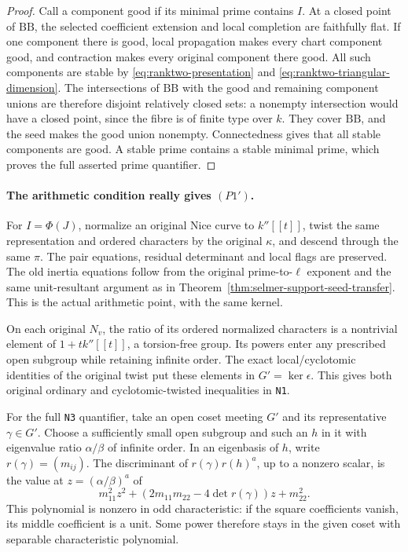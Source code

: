 \begin{proof}
Call a component good if its minimal prime contains $I$.  At a closed
point of $\mathrm{BB}$, the selected coefficient extension and local
completion are faithfully flat.  If one component there is good,
local propagation makes every chart component good, and contraction
makes every original component there good.  All such components
are stable by \eqref{eq:ranktwo-presentation} and
\eqref{eq:ranktwo-triangular-dimension}.  The intersections of
$\mathrm{BB}$ with the good and remaining component unions are
therefore disjoint relatively closed sets: a nonempty intersection
would have a closed point, since the fibre is of finite type over
$k$.  They cover $\mathrm{BB}$, and the seed makes the good union
nonempty.  Connectedness gives that all stable components are good.
A stable prime contains a stable minimal prime, which proves the
full asserted prime quantifier.
\end{proof}

\paragraph{The arithmetic condition really gives $(P1')$.}
For $I=\Phi(J)$, normalize an original Nice curve to $k''[[t]]$,
twist the same representation and ordered characters by the original
$\kappa$, and descend through the same $\pi$.  The pair equations,
residual determinant and local flags are preserved.  The old inertia
equations follow from the original prime-to-$\ell$ exponent and the
same unit-resultant argument as in
Theorem~\ref{thm:selmer-support-seed-transfer}.  This is the actual
arithmetic point, with the same kernel.

On each original $N_v$, the ratio of its ordered normalized
characters is a nontrivial element of $1+tk''[[t]]$, a torsion-free
group.  Its powers enter any prescribed open subgroup while
retaining infinite order.  The exact local/cyclotomic identities of
the original twist put these elements in $G'=\ker\epsilon$.
This gives both original ordinary and cyclotomic-twisted inequalities
in \texttt{N1}.

For the full \texttt{N3} quantifier, take an open coset meeting $G'$
and its representative $\gamma\in G'$.  Choose a sufficiently small
open subgroup and such an $h$ in it with eigenvalue ratio
$\alpha/\beta$ of infinite order.  In an eigenbasis of $h$, write
$r(\gamma)=(m_{ij})$.  The discriminant of $r(\gamma)r(h)^a$,
up to a nonzero scalar, is the value at $z=(\alpha/\beta)^a$ of
\begin{equation}\label{eq:ranktwo-regular-coset}
 m_{11}^2z^2+(2m_{11}m_{22}-4\det r(\gamma))z+m_{22}^2.
\end{equation}
This polynomial is nonzero in odd characteristic: if the square
coefficients vanish, its middle coefficient is a unit.  Some power
therefore stays in the given coset with separable characteristic
polynomial.

